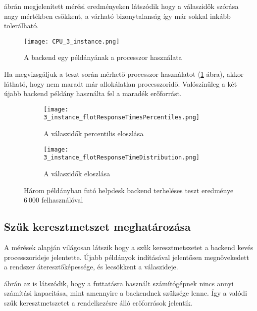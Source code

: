 ábrán megjelenített mérési eredményeken látszódik hogy a válaszidők szórása nagy mértékben csökkent, a várható bizonytalanság így már sokkal inkább tolerálható.



\begin{figure}[hbt] 
	\centering
	\texttt{[image: CPU\_3\_instance.png]}
	\caption{A backend egy példányának a processzor használata}
	\label{fig:3_instance_CPU}
\end{figure}



Ha megvizsgáljuk a teszt során mérhető processzor használatot (\ref{fig:3_instance_CPU} ábra), akkor látható, hogy nem maradt már allokálatlan processzoridő. Valószínűleg a két újabb backend példány használta fel a maradék erőforrást.

\begin{figure}[!hbt]
	\begin{subfigure}{.9\textwidth}
		\centering
		\texttt{[image: 3\_instance\_flotResponseTimesPercentiles.png]}  
		\caption{A válaszidők percentilis eloszlása}
	\end{subfigure}
	\begin{subfigure}{.9\textwidth}
		\centering
		\texttt{[image: 3\_instance\_flotResponseTimeDistribution.png]}  
		\caption{A válaszidők eloszlása}
	\end{subfigure}
	
	\caption[Helpdesk backend terheléses teszt három példánnyal]{Három példányban futó helpdesk backend terheléses teszt eredménye $6~000$ felhasználóval}
	\label{fig:3_instance}
\end{figure}



\subsection{Szűk keresztmetszet meghatározása}\label{sec:szuk_keresztmetszet}
A mérések alapján világosan látszik hogy a szűk keresztmetszetet a backend kevés processzorideje jelentette. Újabb példányok indításával jelentősen megnövekedett a rendszer áteresztőképessége, és lecsökkent a válaszideje.

 ábrán az is látszódik, hogy a futtatásra használt számítógépnek nincs annyi számítási kapacitása, mint amennyire a backendnek szüksége lenne. Így a valódi szűk keresztmetszetet a rendelkezésre álló erőforrások jelentik.


